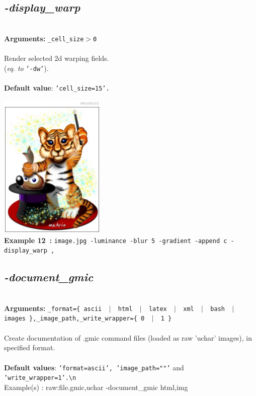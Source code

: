 \documentclass[a4paper,11pt,twoside]{book}
\begin{document}
\subsection{\emph{-display\_warp} }\vspace*{-0.5em}
~\\\textbf{Arguments: } 
{\small \texttt{\_cell\_size$>$0}}\\~\\
Render selected 2d warping fields.
~\\(\emph{eq. to} {\small \texttt{'-dw'}}).
~\\~\\\textbf{Default value}: {\small \texttt{'cell\_size=15'.}}
\begin{center}\includegraphics[keepaspectratio=true,height=7cm,width=\textwidth]{img/gmic_def12.jpg}\\
{\footnotesize \textbf{Example 12~:} \texttt{image.jpg -luminance -blur 5 -gradient -append c -display\_warp ,}}
\end{center}

\subsection{\emph{-document\_gmic} }\vspace*{-0.5em}
~\\\textbf{Arguments: } 
{\small \texttt{\_format=\{ ascii ~$|$~ html ~$|$~ latex ~$|$~ xml ~$|$~ bash ~$|$~ images \},\_image\_path,\_write\_wrapper=\{ 0 ~$|$~ 1 \}}}\\~\\
Create documentation of .gmic command files (loaded as raw 'uchar' images), in specified format.
~\\~\\\textbf{Default values}: {\small \texttt{'format=ascii', 'image\_path=""'} and \texttt{'write\_wrapper=1'.\textbackslash n}}
~\\Example(s) : raw:file.gmic,uchar -document\_gmic html,img
\end{document}
